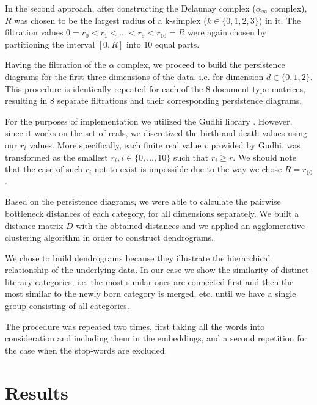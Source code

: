 \documentclass[fleqn]{article}
\begin{document}
	In the second approach, after constructing the Delaunay complex ($\alpha_{\infty}$ complex), $R$ was chosen to be the largest radius of a k-simplex ($k \in \{0,1,2,3\}$) in it.  The filtration values $0=r_0 < r_1 < \dots < r_9 < r_{10} = R$ were again chosen by partitioning the interval $[0, R]$ into $10$ equal parts.
	
	
	Having the filtration of the $\alpha$ complex, we proceed to build the persistence diagrams for the first three dimensions of the data, i.e. for dimension $d \in \{0, 1, 2\}$. This procedure is identically repeated for each of the $8$ document type matrices, resulting in $8$ separate filtrations and their corresponding persistence diagrams.
	
	For the purposes of implementation we utilized the Gudhi library \cite{gudhi:urm}. However, since it works on the set of reals, we  discretized the birth and death values using our $r_i$ values. More specifically, each finite real value $v$ provided by Gudhi, was transformed as the smallest $r_i, i \in \{0, \dots, 10\}$ such that $r_i \geq r$. We should note that the case of such $r_i$ not to exist is impossible due to the way we chose $R = r_{10}$.
	
	Based on the persistence diagrams, we were able to calculate the pairwise bottleneck distances of each category, for all dimensions separately. We built a distance matrix $D$ with the obtained distances and we applied an agglomerative clustering algorithm in order to construct dendrograms.
	
	We chose to build dendrograms because they illustrate the hierarchical relationship of the underlying data. In our case we show the similarity of distinct literary categories, i.e. the most similar ones are connected first and then the most similar to the newly born category is merged, etc. until we have a single group consisting of all categories.
	
	The procedure was repeated two times, first taking all the words into consideration and including them in the embeddings, and a second repetition for the case when the stop-words are excluded. 
	
	\section{Results} \label{results}
	
\end{document}
